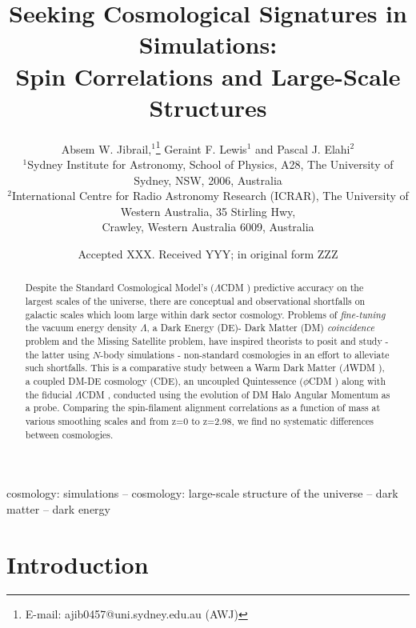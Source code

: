 \documentclass[a4paper,fleqn,usenatbib]{mnras}
\title[Seeking cosmological signatures in simulations]{ Seeking Cosmological Signatures in Simulations:\\ Spin Correlations and Large-Scale Structures }
\author[A. W. Jibrail et al.]{
Absem W. Jibrail,$^{1}$\thanks{E-mail: ajib0457@uni.sydney.edu.au (AWJ)}
Geraint F. Lewis$^{1}$
and Pascal J. Elahi$^{2}$
\\
$^{1}$Sydney Institute for Astronomy, School of Physics, A28, The University of Sydney, NSW, 2006, Australia\\
$^{2}$International Centre for Radio Astronomy Research (ICRAR), The University of Western Australia, 35 Stirling Hwy, \\
Crawley, Western Australia 6009, Australia}
\date{Accepted XXX. Received YYY; in original form ZZZ}
\def \lcdm{$\Lambda$CDM }
\def \lwdm{$\Lambda$WDM }
\def \qcdm{$\phi$CDM }
\begin{document}
\label{firstpage}
\pagerange{\pageref{firstpage}--\pageref{lastpage}}
\maketitle

\begin{abstract}
Despite the Standard Cosmological Model's (\lcdm) predictive accuracy on the largest scales of the universe, there are conceptual and observational shortfalls on galactic scales which loom large within dark sector cosmology. Problems of \textit{fine-tuning} the vacuum energy density $\Lambda$, a Dark Energy (DE)- Dark Matter (DM) \textit{coincidence} problem and the Missing Satellite problem, have inspired theorists to posit and study - the latter using $N$-body simulations - non-standard cosmologies in an effort to alleviate such shortfalls. This is a comparative study between a Warm Dark Matter (\lwdm), a coupled DM-DE cosmology (CDE), an uncoupled Quintessence (\qcdm) along with the fiducial \lcdm, conducted using the evolution of DM Halo Angular Momentum as a probe. Comparing the spin-filament alignment correlations as a function of mass at various smoothing scales and from z=0 to z=2.98, we find no systematic differences between cosmologies. 

\end{abstract}

\begin{keywords}
cosmology: simulations -- cosmology: large-scale structure of the universe -- dark matter -- dark energy
\end{keywords}



\section{Introduction}\label{intro}
\end{document}
